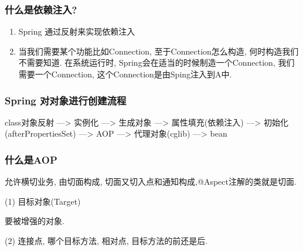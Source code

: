 \documentclass[UTF8]{ctexart}
\begin{document}
	\subsubsection{什么是依赖注入?}
	\begin{enumerate}
		\item Spring 通过反射来实现依赖注入
		\item 当我们需要某个功能比如Connection, 至于Connection怎么构造, 何时构造我们不需要知道. 在系统运行时, Spring会在适当的时候制造一个Connection, 我们需要一个Connection, 这个Connection是由Sping注入到A中. 
	\end{enumerate}
\subsubsection{Spring 对对象进行创建流程}
class对象反射 ---> 实例化 ---> 生成对象 ---> 属性填充(依赖注入)  ---> 初始化(afterPropertiesSet) ---> AOP ---> 代理对象(cglib) ---> bean
\subsubsection{什么是AOP}
允许横切业务, 由切面构成, 切面又切入点和通知构成,@Aspect注解的类就是切面. \par
(1) 目标对象(Target) \par
要被增强的对象. \par
(2) 连接点, 哪个目标方法, 相对点, 目标方法的前还是后.
\end{document}
